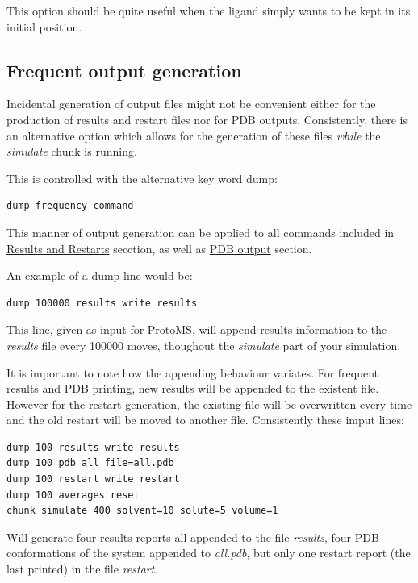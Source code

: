 \documentclass[letterpaper,10pt,english]{sphinxmanual}
\begin{document}
This option should be quite useful when the ligand simply wants to be kept in its initial position.


\subsection{Frequent output generation}
\label{protoms:frequent-output-generation}
Incidental generation of output files might not be convenient either for the production of results and restart files nor for PDB outputs. Consistently, there is an alternative option which allows for the generation of these files \emph{while} the \emph{simulate} chunk is running.

This is controlled with the alternative key word dump:

\begin{Verbatim}[commandchars=\\\{\}]
dump frequency command
\end{Verbatim}

This manner of output generation can be applied to all commands included in {\hyperref[protoms:results-and-restarts]{Results and Restarts}} secction, as well as {\hyperref[protoms:pdb-output]{PDB output}} section.

An example of a dump line would be:

\begin{Verbatim}[commandchars=\\\{\}]
dump 100000 results write results
\end{Verbatim}

This line, given as input for ProtoMS, will append results information to the \emph{results} file every 100000 moves, thoughout the \emph{simulate} part of your simulation.

It is important to note how the appending behaviour variates. For frequent results and PDB printing, new results will be appended to the existent file. However for the restart generation, the existing file will be overwritten every time and the old restart will be moved to another file. Consistently these imput lines:

\begin{Verbatim}[commandchars=\\\{\}]
dump 100 results write results
dump 100 pdb all file=all.pdb
dump 100 restart write restart
dump 100 averages reset
chunk simulate 400 solvent=10 solute=5 volume=1
\end{Verbatim}

Will generate four results reports all appended to the file \emph{results}, four PDB conformations of the system appended to \emph{all.pdb}, but only one restart report (the last printed) in the file \emph{restart}.
\end{document}

